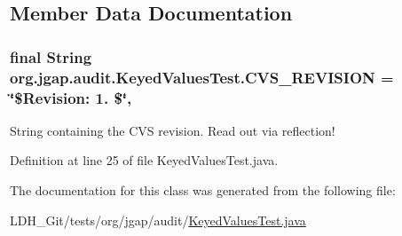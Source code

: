 \subsection{Member Data Documentation}
\hypertarget{classorg_1_1jgap_1_1audit_1_1_keyed_values_test_aa8deb6854332fc6068d33127a01d0afb}{
\subsubsection[{C\-V\-S\-\_\-\-R\-E\-V\-I\-S\-I\-O\-N}]{\setlength{\rightskip}{0pt plus 5cm}final String org.\-jgap.\-audit.\-Keyed\-Values\-Test.\-C\-V\-S\-\_\-\-R\-E\-V\-I\-S\-I\-O\-N = \char`\"{}\$Revision\-: 1. \$\char`\"{}\hspace{0.3cm}{\ttfamily [static]}, {\ttfamily [private]}}}\label{classorg_1_1jgap_1_1audit_1_1_keyed_values_test_aa8deb6854332fc6068d33127a01d0afb}
String containing the C\-V\-S revision. Read out via reflection! 

Definition at line 25 of file Keyed\-Values\-Test.\-java.



The documentation for this class was generated from the following file\-:\begin{DoxyCompactItemize}
\item 
L\-D\-H\-\_\-\-Git/tests/org/jgap/audit/\hyperlink{_keyed_values_test_8java}{Keyed\-Values\-Test.\-java}\end{DoxyCompactItemize}
